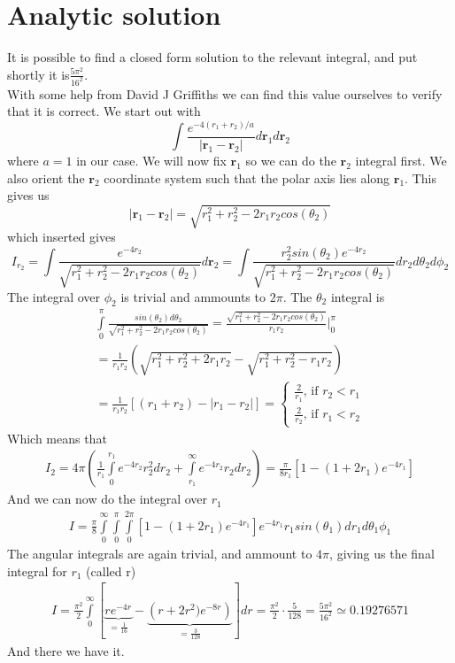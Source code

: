 \documentclass[a4paper,english, 10pt, twoside]{article}
\begin{document}
\section*{Analytic solution}
It is possible to find a closed form solution to the relevant integral, and put shortly it is$\frac{5\pi^2}{16^2}$.\\
With some help from David J Griffiths we can find this value ourselves to verify that it is correct.
We start out with
$$
\int\frac{e^{-4(r_1+r_2)/a}}{\left|\mathbf{r}_1 - \mathbf{r}_2\right|}d\mathbf{r}_1d\mathbf{r}_2
$$
where $a=1$ in our case. We will now fix $\mathbf{r}_1$ so we can do the $\mathbf{r}_2$ integral first. We also orient the 
$\mathbf{r}_2$ coordinate system such that the polar axis lies along $\mathbf{r}_1$. This gives us
$$
\left|\mathbf{r}_1 - \mathbf{r}_2\right| = \sqrt{r_1^2+r_2^2 -2r_1r_2cos(\theta_2)}
$$
which inserted gives
$$
I_{r_2} = \int\frac{e^{-4r_2}}{\sqrt{r_1^2+r_2^2 -2r_1r_2cos(\theta_2)}}d\mathbf{r}_2 = 
\int\frac{r_2^2sin(\theta_2)e^{-4r_2}}{\sqrt{r_1^2+r_2^2 -2r_1r_2cos(\theta_2)}}dr_2d\theta_2d\phi_2
$$
The integral over $\phi_2$ is trivial and ammounts to $2\pi$. The $\theta_2$ integral is
\begin{align*}
\int\limits_0^\pi\frac{sin(\theta_2)d\theta_2}{\sqrt{r_1^2+r_2^2 -2r_1r_2cos(\theta_2)}} 
= \frac{\sqrt{r_1^2+r_2^2 -2r_1r_2cos(\theta_2)}}{r_1r_2}\Bigg|_0^\pi\\
=\frac{1}{r_1r_2}\left(\sqrt{r_1^2 + r_2^2 +2r_1r_2}-\sqrt{r_1^2+r_2^2 -r_1r_2}\right)\\
=\frac{1}{r_1r_2}[(r_1+r_2)-\left|r_1-r_2\right|] = 
\begin{cases}
\frac{2}{r_1} \text{, if  } r_2<r_1 \\
\frac{2}{r_2} \text{, if  } r_1<r_2
\end{cases}
\end{align*}
Which means that
\begin{align*}
I_2 = 4\pi\left(\frac{1}{r_1}\int\limits_0^{r_1}e^{-4r_2}r_2^2dr_2 + \int\limits_{r_1}^\infty e^{-4r_2}r_2dr_2\right) = 
\frac{\pi}{8r_1}\left[1-\left(1+2r_1\right)e^{-4r_1}\right]
\end{align*}
And we can now do the integral over $r_1$
\begin{align*}
I = \frac{\pi}{8}\int\limits_0^\infty\int\limits_0^\pi\int\limits_0^{2\pi}
\left[1-\left(1+2r_1\right)e^{-4r_1}\right]e^{-4r_1}r_1sin(\theta_1)dr_1d\theta_1\phi_1
\end{align*}
The angular integrals are again trivial, and ammount to $4\pi$, giving us the final integral for $r_1$ (called r)
\begin{align*}
 I = \frac{\pi^2}{2}\int\limits_0^\infty\left[\underbrace{re^{-4r}}_{=\frac{1}{16}}-
 \underbrace{\left(r+2r^2)e^{-8r}\right)}_{=\frac{3}{128}}\right]dr = \frac{\pi^2}{2}\cdot\frac{5}{128} = \frac{5\pi^2}{16^2} 
 \simeq 0.19276571
\end{align*}
And there we have it. 
\end{document}

